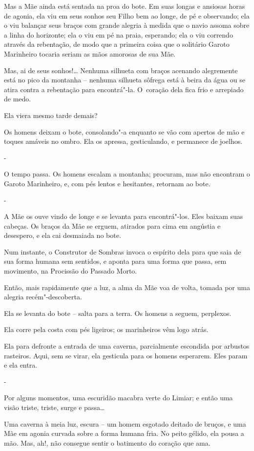 Mas a Mãe ainda está sentada na proa do bote. Em suas longas e ansiosas
horas de agonia, ela viu em seus sonhos seu Filho bem ao longe, de pé e
observando; ela o viu balançar seus braços com grande alegria à medida
que o navio assoma sobre a linha do horizonte; ela o viu em pé na praia,
esperando; ela o viu correndo através da rebentação, de modo que a
primeira coisa que o solitário Garoto Marinheiro tocaria seriam as mãos
amorosas de sua Mãe.

Mas, ai de seus sonhos!… Nenhuma silhueta com braços acenando
alegremente está no pico da montanha -- nenhuma silhueta sôfrega está à
beira da água ou se atira contra a rebentação para encontrá"-la. O~coração dela fica frio e arrepiado de medo.

Ela viera mesmo tarde demais?

Os homens deixam o bote, consolando"-a enquanto se vão com apertos de mão
e toques amáveis no ombro. Ela os apressa, gesticulando, e permanece de
joelhos.

-

O tempo passa. Os homens escalam a montanha; procuram, mas não encontram
o Garoto Marinheiro, e, com pés lentos e hesitantes, retornam ao bote.

-

A Mãe os ouve vindo de longe e se levanta para encontrá"-los. Eles baixam
suas cabeças. Os braços da Mãe se erguem, atirados para cima em angústia
e desespero, e ela cai desmaiada no bote.

Num instante, o Construtor de Sombras invoca o espírito dela para que
saia de sua forma humana sem sentidos, e aponta para uma forma que
passa, sem movimento, na Procissão do Passado Morto.

Então, mais rapidamente que a luz, a alma da Mãe voa de volta, tomada
por uma alegria recém"-descoberta.

Ela se levanta do bote -- salta para a terra. Os homens a seguem,
perplexos.

Ela corre pela costa com pés ligeiros; os marinheiros vêm logo atrás.

Ela para defronte a entrada de uma caverna, parcialmente escondida por
arbustos rasteiros. Aqui, sem se virar, ela gesticula para os homens
esperarem. Eles param e ela entra.

-

Por alguns momentos, uma escuridão macabra verte do Limiar; e então uma
visão triste, triste, surge e passa…

Uma caverna à meia luz, escura -- um homem esgotado deitado de bruços, e
uma Mãe em agonia curvada sobre a forma humana fria. No peito gélido,
ela pousa a mão. Mas, ah!, não consegue sentir o batimento do coração
que ama.

